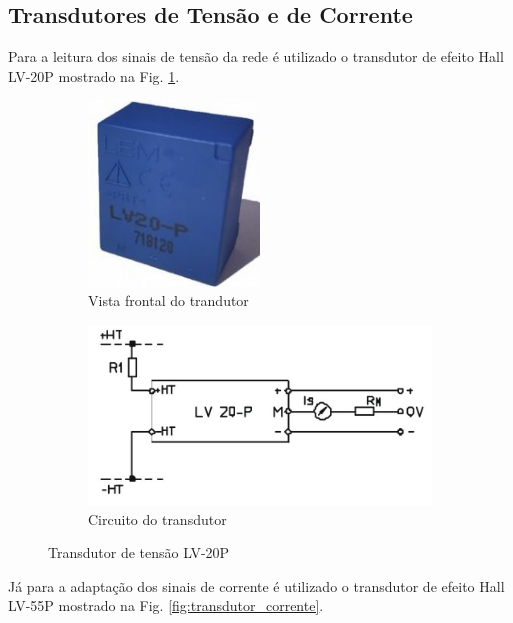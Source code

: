 \subsection{Transdutores de Tensão e de Corrente}

Para a leitura dos sinais de tensão da rede é utilizado o transdutor de efeito Hall LV-20P mostrado na Fig. \ref{fig:transdutor_tensao}. 

\begin{figure}[!hbt]
	\centering
	\begin{subfigure}[b]{0.4\textwidth}
		\centering
		\includegraphics[width=0.5\textwidth]{figuras/Transdutor_Tensao.jpg}
		\caption{Vista frontal do trandutor}
	\end{subfigure}
	\begin{subfigure}[b]{0.4\textwidth}
		\includegraphics[width=\textwidth]{figuras/Transdutor_Tensao_Circuito.jpg}
		\caption{Circuito do transdutor}
	\end{subfigure}
	\caption{Transdutor de tensão LV-20P}\label{fig:transdutor_tensao}
\end{figure}

Já para a adaptação dos sinais de corrente é utilizado o transdutor de efeito Hall LV-55P mostrado na Fig. \ref{fig:transdutor_corrente}.

